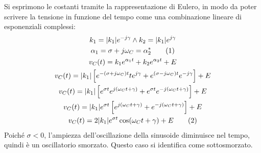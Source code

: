 \documentclass{article}
\newcommand{\tageq}{\tag{\stepcounter{equation}\theequation}}
\numberwithin{equation}{subsection}
\begin{document}
Si esprimono le costanti tramite la rappresentazione di Eulero, in modo da poter scrivere la tensione in funzione del tempo come una combinazione lineare di esponenziali 
complessi:
\begin{gather*}
    k_1=|k_1|e^{-j\gamma}\land k_2=|k_1|e^{j\gamma}\\
    \alpha_1=\sigma+j\omega_C=\alpha_2^*\tageq\\
    v_C(t)=k_1e^{\alpha_1t}+k_2e^{\alpha_2t}+E\\
    v_C(t)=|k_1|\left[e^{-(\sigma+j\omega_C)t}te^{j\gamma}+e^{(\sigma-j\omega_C)t}e^{-j\gamma}\right]+E\\
    v_C(t)=|k_1|\left[e^{\sigma t}e^{j(\omega_Ct+\gamma)}+e^{\sigma t}e^{-j(\omega_Ct+\gamma)}\right]+E\\
    v_C(t)=|k_1|e^{\sigma t}\left[e^{j(\omega_Ct+\gamma)}+e^{-j(\omega_Ct+\gamma)}\right]+E\\
    v_C(t)=2|k_1|e^{\sigma t}\cos(\omega_Ct+\gamma)+E\tageq
\end{gather*}
Poiché $\sigma<0$, l'ampiezza dell'oscillazione della sinusoide diminuisce nel tempo, quindi è un oscillatorio smorzato. Questo caso si identifica come sottosmorzato. 
\end{document}
